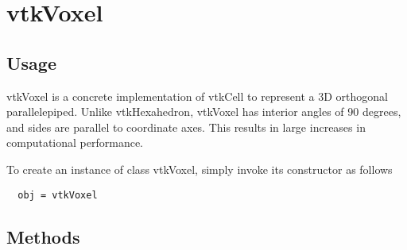 \section{vtkVoxel}

\subsection{Usage}

 vtkVoxel is a concrete implementation of vtkCell to represent a 3D
 orthogonal parallelepiped. Unlike vtkHexahedron, vtkVoxel has interior
 angles of 90 degrees, and sides are parallel to coordinate axes. This
 results in large increases in computational performance.

To create an instance of class vtkVoxel, simply
invoke its constructor as follows
\begin{verbatim}
  obj = vtkVoxel
\end{verbatim}
\subsection{Methods}

